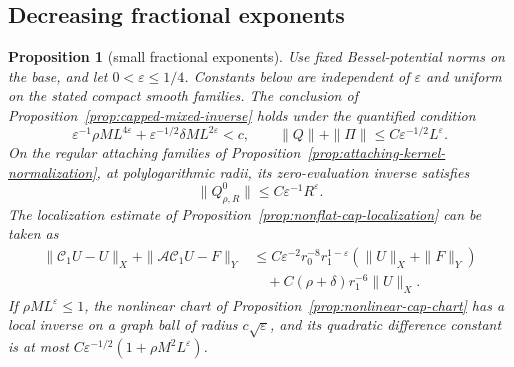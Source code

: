 \documentclass[11pt]{amsart}
\newtheorem{proposition}[theorem]{Proposition}
\theoremstyle{definition}
\theoremstyle{remark}
\theoremstyle{plain}
\begin{document}
\subsection{Decreasing fractional exponents}
\begin{proposition}[small fractional exponents]
\label{prop:small-fractional-exponents}
Use fixed Bessel-potential norms on the base, and let
$0<\varepsilon\leq1/4$. Constants below are independent of
$\varepsilon$ and uniform on the stated compact smooth families.
The conclusion of Proposition~\ref{prop:capped-mixed-inverse}
holds under the quantified condition
\begin{equation}\label{eq:small-exponent-cap-criterion}
 \varepsilon^{-1}\rho ML^{4\varepsilon}
 +\varepsilon^{-1/2}\delta ML^{2\varepsilon}<c,
 \qquad
 \|Q\|+\|\Pi\|\leq C\varepsilon^{-1/2}L^\varepsilon.
\end{equation}
On the regular attaching families of
Proposition~\ref{prop:attaching-kernel-normalization}, at
polylogarithmic radii, its zero-evaluation inverse satisfies
\begin{equation}\label{eq:small-exponent-normalized-inverse}
                         \|Q^0_{\rho,R}\|
                                  \leq C\varepsilon^{-1}R^\varepsilon.
\end{equation}
The localization estimate of
Proposition~\ref{prop:nonflat-cap-localization} can be taken as
\begin{equation}\label{eq:small-exponent-localization}
 \begin{split}
 \|\mathcal C_1U-U\|_X+\|\mathcal A\mathcal C_1U-F\|_Y
 &\leq C\varepsilon^{-2}r_0^{-8}r_1^{1-\varepsilon}
                       (\|U\|_X+\|F\|_Y)\\
 &\quad+C(\rho+\delta)r_1^{-6}\|U\|_X.
 \end{split}
\end{equation}
If $\rho ML^\varepsilon\leq1$, the nonlinear chart of
Proposition~\ref{prop:nonlinear-cap-chart} has a local inverse
on a graph ball of radius $c\sqrt\varepsilon$, and its
quadratic difference constant is at most
$C\varepsilon^{-1/2}(1+\rho M^2L^\varepsilon)$.
\end{proposition}
\end{document}
